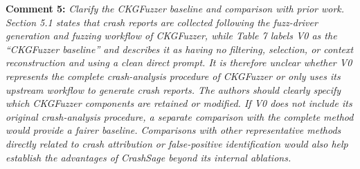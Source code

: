 \documentclass[onecolumn,11pt]{article}
\newcommand{\secc}[2]{\par\mySep \noindent \textsf{\textbf{#1 }}\textit{#2}\par}
\newcommand{\mySep}{\vspace{8pt}}
\begin{document}
\secc{Comment 5:}{Clarify the CKGFuzzer baseline and comparison with prior work. Section 5.1 states that crash reports are collected following the fuzz-driver generation and fuzzing workflow of CKGFuzzer, while Table 7 labels V0 as the ``CKGFuzzer baseline'' and describes it as having no filtering, selection, or context reconstruction and using a clean direct prompt. It is therefore unclear whether V0 represents the complete crash-analysis procedure of CKGFuzzer or only uses its upstream workflow to generate crash reports. The authors should clearly specify which CKGFuzzer components are retained or modified. If V0 does not include its original crash-analysis procedure, a separate comparison with the complete method would provide a fairer baseline. Comparisons with other representative methods directly related to crash attribution or false-positive identification would also help establish the advantages of CrashSage beyond its internal ablations.}
\end{document}
